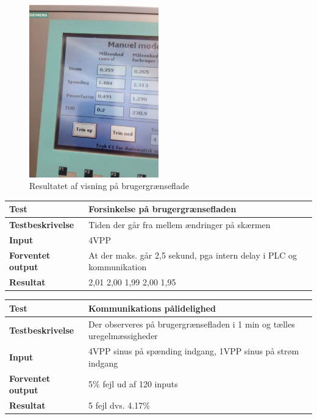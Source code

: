 \begin{figure}[H] %
	\centering
	\includegraphics[width=0.5\textwidth]{Test/Visningstest1}
	\caption{Resultatet af visning på brugergrænseflade}
	\label{fig:visningtest1}
\end{figure}


\begin{center}
	\begin{tabular}{ | m{} | m{}|} 
		\hline
		\textbf{Test}					&Forsinkelse på brugergrænsefladen \\ \hline
		\textbf{Testbeskrivelse}		&Tiden der går fra mellem ændringer på skærmen \\ \hline
		\textbf{Input}					&4VPP \\ \hline
		\textbf{Forventet output}		&At der maks. går 2,5 sekund, pga intern delay i PLC og kommunikation \\ \hline
		\textbf{Resultat}				&2,01 2,00 1,99 2,00 1,95   \\ \hline
	\end{tabular}
\end{center}


\begin{center}
	\begin{tabular}{ | m{} | m{}|} 
		\hline
		\textbf{Test}					&Kommunikations pålidelighed \\ \hline
		\textbf{Testbeskrivelse}		&Der observeres på brugergrænsefladen i 1 min og tælles uregelmæssigheder \\ \hline
		\textbf{Input}					&4VPP sinus på spænding indgang, 1VPP sinus på strøm indgang\\ \hline
		\textbf{Forventet output}		&5\% fejl ud af 120 inputs \\ \hline
		\textbf{Resultat}				&5 fejl dvs. 4.17\%  \\ \hline
	\end{tabular}
\end{center}
